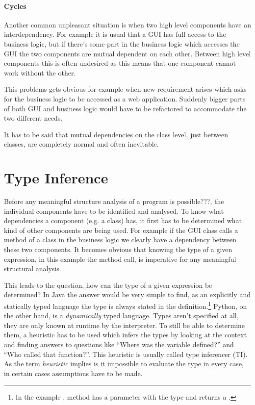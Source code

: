 \documentclass[12pt,halfparskip,DIV11,BCOR10mm]{scrreprt}
\begin{document}
\paragraph{Cycles}
Another common unpleasant situation is when two high level components have an interdependency. For example it is usual that a GUI has full access to the business logic, but if there's some part in the business logic which accesses the GUI the two components are mutual dependent on each other. Between high level components this is often undesired as this means that one component cannot work without the other.

This problems gets obvious for example when new requirement arises which asks for the business logic to be accessed as a web application. Suddenly bigger parts of both GUI and business logic would have to be refactored to accommodate the two different needs.

It has to be said that mutual dependencies on the class level, just between classes, are completely normal and often inevitable.

\section{Type Inference}

Before any meaningful structure analysis of a program is possible???, the individual components have to be identified and analysed. To know what dependencies a component (e.g. a class) has, it first has to be determined what kind of other components are being used. For example if the GUI class calls a method of a class in the business logic we clearly have a dependency between these two components. It becomes obvious that knowing the type of a given expression, in this example the method call, is imperative for any meaningful structural analysis.

This leads to the question, how can the type of a given expression be determined? In Java the answer would be very simple to find, as an explicitly and statically typed language the type is always stated in the definition.\footnote{In the example , method  has a parameter  with the type  and returns a .} Python, on the other hand, is a \emph{dynamically} typed language. Types aren't specified at all, they are only known at runtime by the interpreter. To still be able to determine them, a heuristic has to be used which infers the types by looking at the context and finding answers to questions like ``Where was the variable defined?'' and ``Who called that function?''. This heuristic is usually called type inferencer (TI). As the term \emph{heuristic} implies is it impossible to evaluate the type in every case, in certain cases assumptions have to be made.
\end{document}
